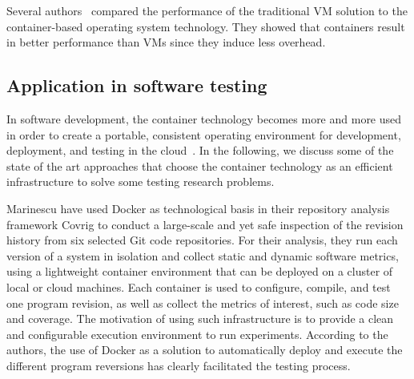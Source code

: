 Several authors~\cite{spoiala2016performance,soltesz2007container,merkel2014docker,felter2015updated} compared the performance of the traditional VM solution to the container-based operating system technology. They showed that containers result in better performance than VMs since they induce less overhead. 


\subsection{Application in software testing}  
In software development, the container technology becomes more and more used in order to create a portable, consistent operating environment for development, deployment, and testing in the cloud~\cite{li2015rest}.
In the following, we discuss some of the state of the art approaches that choose the container technology as an efficient infrastructure to solve some testing research problems. 

Marinescu \etal\cite{marinescu2014covrig} have used Docker as technological basis in their repository analysis framework Covrig to conduct a large-scale and yet safe inspection of the revision history from six selected Git code repositories. 
For their analysis, they run each version of a system in isolation and collect static and dynamic software metrics, using a lightweight container environment that can be deployed on a cluster of local or cloud machines. Each container is used to configure, compile, and test one program revision, as well as collect the metrics of interest, such as code size and coverage.
The motivation of using such infrastructure is to provide a clean and configurable execution environment to run experiments. According to the authors, the use of Docker as a solution to automatically deploy and execute the different program reversions has clearly facilitated the testing process.


